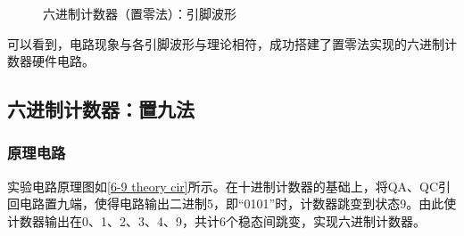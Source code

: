 \documentclass[UTF8]{ctexart}
\numberwithin{figure}{subsection}
\numberwithin{table}{subsection}
\numberwithin{equation}{subsection}
\begin{document}
\begin{figure}[H]
    \centering
    \caption{六进制计数器（置零法）：引脚波形}
    \label{6-0 osci}
\end{figure}

\par 可以看到，电路现象与各引脚波形与理论相符，成功搭建了置零法实现的六进制计数器硬件电路。

\subsection{六进制计数器：置九法}
\subsubsection{原理电路}
\par 实验电路原理图如\ref{6-9 theory cir}所示。在十进制计数器的基础上，将QA、QC引回电路置九端，使得电路输出二进制5，即“0101”时，计数器跳变到状态9。由此使计数器输出在0、1、2、3、4、9，共计6个稳态间跳变，实现六进制计数器。
\end{document}
